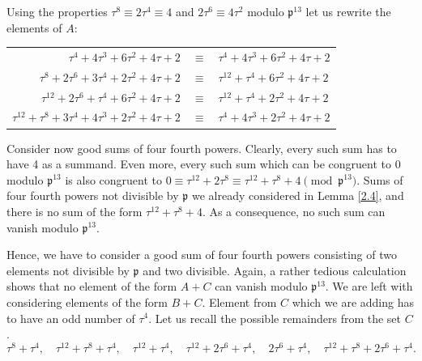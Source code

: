 \documentclass[12pt]{article}
\theoremstyle{remark}
\newcommand{\p}{\mathfrak{p}}
\begin{document}
 Using the properties $\tau^8\equiv 2\tau^4 \equiv 4$ and $2\tau^6 \equiv 4\tau^2$  modulo $\mathfrak{p}^{13}$ let us rewrite the elements of $A$:
\begin{center}
\begin{tabular}{r c l}
    $\tau^4 + 4\tau^3 + 6\tau^2 + 4\tau +2$ & $\equiv$ & $\tau^4 + 4\tau^3 + 6\tau^2 + 4\tau +2$  \\
   $\tau^8 + 2\tau^6 + 3\tau^4 + 2\tau^2 + 4\tau + 2$ & $\equiv$ & $\tau^{12}  + \tau^4 + 6\tau^2 + 4\tau + 2$ \\
    $\tau^{12} + 2\tau^6 + \tau^4 + 6\tau^2 + 4\tau +2$ & $\equiv$ & $\tau^{12}  + \tau^4 + 2\tau^2 + 4\tau +2$ \qquad \qquad \quad \quad \\
    $\tau^{12}+\tau^8+3\tau^4+4\tau^3+2\tau^2+4\tau+2$ & $\equiv$ & $\tau^4+4\tau^3+2\tau^2+4\tau+2$
\end{tabular}
\end{center}




Consider now good sums of four fourth powers. Clearly, every such sum has to have 4 as a summand. Even more,  every such sum which can be congruent to 0 modulo $\mathfrak{p}^{13}$ is also congruent to $0 \equiv \tau^{12} + 2\tau^8 \equiv \tau^{12} + \tau^8 + 4 \pmod{\mathfrak{p}^{13}}$. Sums of four fourth powers not divisible by $\p$ we already considered in Lemma \ref{2.4}, and there is no sum of the form $\tau^{12} + \tau^8 + 4$. As a consequence, no such sum can vanish modulo $\p^{13}$.


Hence, we have to consider a good sum of four fourth powers consisting of two elements not divisible by $\p$ and two divisible. Again, a rather tedious calculation shows that no element of the form $A+C$ can vanish modulo $\p^{13}$. We are left with considering elements of the form $B+C$. Element from $C$ which we are adding has to have an odd number of $\tau^4$. Let us recall the possible remainders from the set $C$.
\[\tau^8 + \tau^4, \quad \tau^{12}+\tau^8+\tau^4, \quad \tau^{12}+\tau^4, \quad \tau^{12}+2\tau^6 + \tau^4, \quad 2\tau^6 + \tau^4, \quad \tau^{12}+\tau^8+2\tau^6+\tau^4.\]
\end{document}

